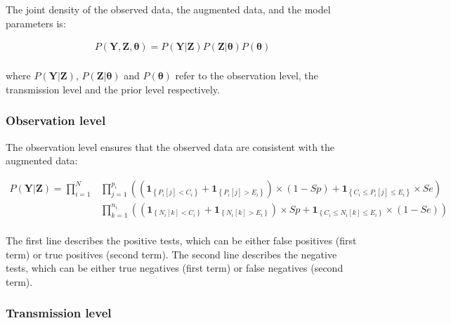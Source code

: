 \documentclass[10pt]{article}
\begin{document}
The joint density of the observed data, the augmented data, and the model parameters is: 

\begin{equation} \label {JointDensity}
\begin{split}
P\left(\bm{Y},\bm{Z},\bm{\theta}\right) = P\left(\bm{Y}|\bm{Z}\right)P\left(\bm{Z}|\bm{\theta}\right)P\left(\bm{\theta}\right)\\ \nonumber
\end{split}
\end{equation}

\noindent where $P\left(\bm{Y}|\bm{Z}\right)$, $P\left(\bm{Z}|\bm{\theta}\right)$ 
and $P\left(\bm{\theta}\right)$ refer to the observation level, the transmission level
 and the prior level respectively.


\subsubsection*{Observation level}


The observation level ensures that the observed data are consistent with the augmented data:

\begin{eqnarray*}
P\left(\bm{Y}|\bm{Z}\right) =
\bm{\prod}_{i=1}^N %
& \bm{\prod}_{j=1}^{p_i} %
\left(
\left( \mathbf{1}_{\left\lbrace P_i[j] < C_i \right\rbrace}+\mathbf{1}_{\left\lbrace P_i[j] > E_i \right\rbrace} \right) \times \left(1-Sp\right) %
+ \mathbf{1}_{\left\lbrace C_i \leq P_i[j] \leq E_i \right\rbrace} \times Se %
\right) \\ 
& \bm{\prod}_{k=1}^{n_i} %
\left(
\left( \mathbf{1}_{\left\lbrace N_i[k] < C_i \right\rbrace}+\mathbf{1}_{\left\lbrace N_i[k] > E_i \right\rbrace} \right) \times Sp %
+ \mathbf{1}_{\left\lbrace C_i \leq N_i[k] \leq E_i \right\rbrace} \times \left(1-Se\right) %
\right) \\ 
\end{eqnarray*}

The first line describes the positive tests, which can be either false positives (first term) or true positives (second term). 
The second line describes the negative tests, which can be either true negatives (first term) or false negatives (second term). 


\subsubsection*{Transmission level} 
\end{document}
